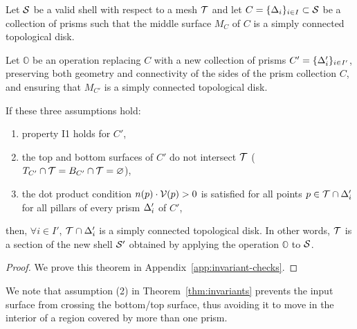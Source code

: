 \begin{theorem}\label{thm:invariants}
Let $\S$ be a valid shell with respect to a mesh $\T$ and let $C=\{\Prism_i\}_{i\in I} \subset \S$ be a collection of prisms such that the middle surface $M_C$ of $C$ is a simply connected topological disk.

Let $\mathbb{O}$ be an operation replacing $C$ with a new collection of prisms $C'=\{\Prism_i'\}_{i\in I'}$, preserving both geometry and connectivity of the sides of the prism collection $C$, and ensuring that $M_{C'}$ is a simply connected topological disk.

If these three assumptions hold:
\begin{enumerate}
    \item property I1 holds for $C'$, %
    \item the top and bottom surfaces of $C'$ do not intersect $\T$ ($T_{C'} \cap \T = B_{C'}\cap \T = \varnothing$), %
    \item the dot product condition $n(p) \cdot \V(p)>0$ is satisfied for all points $p \in \T\cap \Prism_i'$ for all pillars of every prism $\Prism_i'$ of $C'$, %
\end{enumerate}
then, $\forall i \in I'$, $\T \cap \Prism_i'$ is a simply connected topological disk.
In other words, $\T$ is a section of the new shell $\S'$ obtained by applying the operation  $\mathbb{O}$ to $\S$.
\end{theorem}
\begin{proof}
We prove this theorem in Appendix~\ref{app:invariant-checks}.
\end{proof}


We note that assumption (2) in Theorem~\ref{thm:invariants} prevents the input surface from crossing the bottom/top surface, thus avoiding it to move in the interior of a region covered by more than one prism. 

